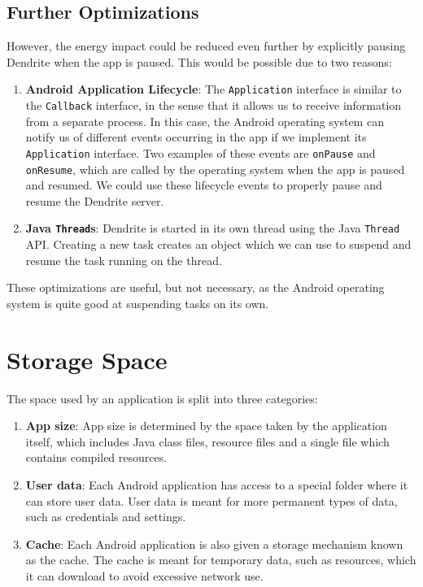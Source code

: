 \subsection{Further Optimizations}
However, the energy impact could be reduced even further by explicitly pausing Dendrite when the app is paused.
This would be possible due to two reasons:
\begin{enumerate}
	\item{
	      \textbf{Android Application Lifecycle}:
	      The \texttt{Application} interface is similar to the \texttt{Callback} interface, in the sense that it allows us to receive information from a separate process.
	      In this case, the Android operating system can notify us of different events occurring in the app if we implement its \texttt{Application} interface.
	      Two examples of these events are \texttt{onPause} and \texttt{onResume}, which are called by the operating system when the app is paused and resumed.
	      We could use these lifecycle events to properly pause and resume the Dendrite server.
	      }
	\item{
	      \textbf{Java \texttt{Thread}s}:
	      Dendrite is started in its own thread using the Java \texttt{Thread} \ac{API}\@.
	      Creating a new task creates an object which we can use to suspend and resume the task running on the thread.
	      }
\end{enumerate}

These optimizations are useful, but not necessary, as the Android operating system is quite good at suspending tasks on its own.

\section{Storage Space}\label{sec:storage_space}
The space used by an application is split into three categories:
\begin{enumerate}
	\item{
	      \textbf{App size}:
	      App size is determined by the space taken by the application itself, which includes Java class files, resource files and a single file which contains compiled resources\cite{android_devdocs_apksize}.
	      }
	\item{
	      \textbf{User data}:
	      Each Android application has access to a special folder where it can store user data.
	      User data is meant for more permanent types of data, such as credentials and settings.
	      }
	\item{
	      \textbf{Cache}:
	      Each Android application is also given a storage mechanism known as the cache.
	      The cache is meant for temporary data, such as resources, which it can download to avoid excessive network use.
	      }
\end{enumerate}

